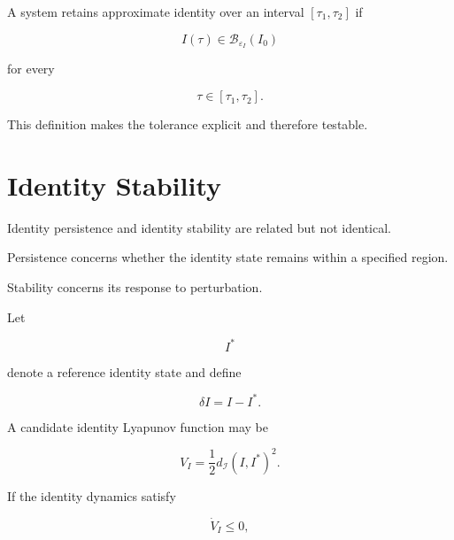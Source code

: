 \documentclass[12pt,oneside]{book}
\begin{document}
A system retains approximate identity over an interval
\([\tau_1,\tau_2]\) if

\begin{equation}
    I(\tau)
    \in
    \mathcal{B}_{\varepsilon_I}(I_0)
\end{equation}

for every

\begin{equation}
    \tau
    \in
    [\tau_1,\tau_2].
\end{equation}

This definition makes the tolerance explicit and therefore
testable.


\section{Identity Stability}
\label{sec:identity-stability}

Identity persistence and identity stability are related but not
identical.

Persistence concerns whether the identity state remains within a
specified region.

Stability concerns its response to perturbation.

Let

\begin{equation}
    I^\ast
\end{equation}

denote a reference identity state and define

\begin{equation}
    \delta I
    =
    I-I^\ast.
\end{equation}

A candidate identity Lyapunov function may be

\begin{equation}
    V_I
    =
    \frac{1}{2}
    d_{\mathcal{I}}
    \left(
        I,
        I^\ast
    \right)^2.
    \label{eq:identity-lyapunov-function}
\end{equation}

If the identity dynamics satisfy

\begin{equation}
    \dot{V}_I
    \leq
    0,
    \label{eq:identity-lyapunov-condition}
\end{equation}
\end{document}
